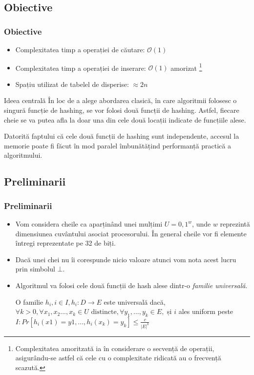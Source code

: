 \documentclass{beamer}
\begin{document}
\subsection{Obiective}

\begin{frame}
\frametitle{Obiective}
\begin{itemize}
\item Complexitatea timp a operației de căutare: $\mathcal{O}(1)$
\item Complexitatea timp a operației de inserare: $\mathcal{O}(1)$ amorizat \footnote{Complexitatea amoritzată ia în considerare o secvență de operații, asigurându-se astfel că cele cu o complexitate ridicată au o frecvență scazută.}
\item Spațiu utilizat de tabelel de disperise: $\approx 2n$
\end{itemize}

\begin{block}{Ideea centrală}
În loc de a alege abordarea clasică, în care algoritmii folosesc o singură funcție de hashing, se vor folosi două funcții de hashing. Astfel, fiecare cheie se va putea afla la doar una din cele două locații indicate de funcțiile alese. 
\end{block}

Datorită faptului că cele două funcții de hashing sunt independente, accesul la memorie poate fi făcut în mod paralel îmbunătățind performanță practică a algoritmului.

\end{frame}
\subsection{Preliminarii}

\begin{frame}
\frametitle{Preliminarii}
\begin{itemize}
\item Vom considera cheile ca aparținând unei mulțimi $U = {0,1}^w$, unde $w$ reprezintă dimensiunea cuvântului asociat procesorului. În general cheile vor fi elemente întregi reprezentate pe 32 de biți.
\item Dacă unei chei nu îi corespunde nicio valoare atunci vom nota acest lucru prin simbolul $\bot$.
\item Algoritmul va folosi cele două funcții de hash alese dintr-o \textit{familie universală}.
\begin{definition}
O familie  $h_i, i \in I, h_i:D \to E$  este universală dacă, $\forall k > 0, \forall x_1, x_2 ..., x_k \in U \text{ distincte}, \forall y_1, ..., y_k \in E,$ și $i$ ales uniform peste $I: Pr[h_i(x1) = y1, ..., h_i(x_k) = y_k] \leq \frac{c}{|E|^k}$
\end{definition}
\end{itemize}

\end{frame}
\end{document}
